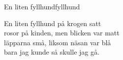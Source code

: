 \begin{song}{En liten fyllhund}{fyllhund}
\begin{vers}
En liten fyllhund på krogen satt\\
rosor på kinden, men blicken var matt\\
läpparna små, liksom näsan var blå\\
bara jag kunde så skulle jag gå.\\
\end{vers}
\end{song}
